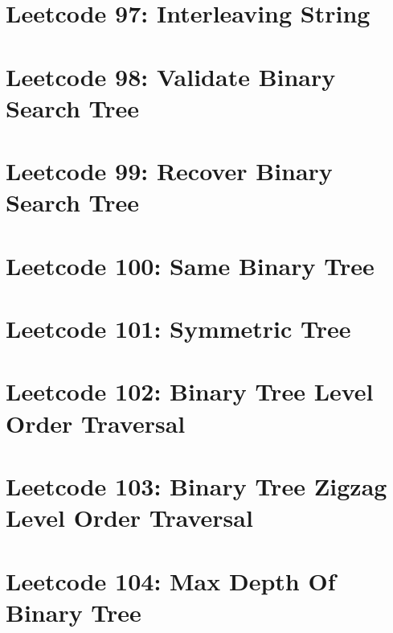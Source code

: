 \documentclass{article}
\begin{document}
\section*{Leetcode 97: Interleaving String}

\pagebreak 

\section*{Leetcode 98: Validate Binary Search Tree}

\pagebreak 

\section*{Leetcode 99: Recover Binary Search Tree}

\pagebreak 

\section*{Leetcode 100: Same Binary Tree}

\pagebreak 

\section*{Leetcode 101: Symmetric Tree}

\pagebreak 

\section*{Leetcode 102: Binary Tree Level Order Traversal}

\pagebreak 

\section*{Leetcode 103: Binary Tree Zigzag Level Order Traversal}

\pagebreak 

\section*{Leetcode 104: Max Depth Of Binary Tree}

\pagebreak 
\end{document}

